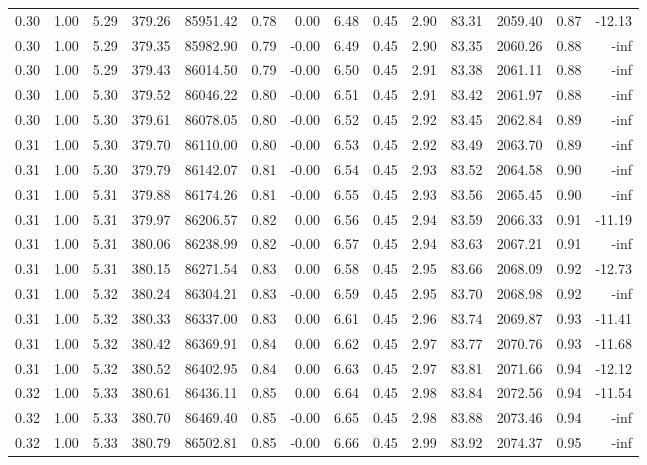 \begin{table}[!ht]
\begin{tabular}{rrrrrrrrrrrrrr}
0.30 & 1.00 & 5.29 & 379.26 & 85951.42 & 0.78 & 0.00 & 6.48 & 0.45 & 2.90 & 83.31 & 2059.40 & 0.87 & -12.13 \\
0.30 & 1.00 & 5.29 & 379.35 & 85982.90 & 0.79 & -0.00 & 6.49 & 0.45 & 2.90 & 83.35 & 2060.26 & 0.88 & -inf \\
0.30 & 1.00 & 5.29 & 379.43 & 86014.50 & 0.79 & -0.00 & 6.50 & 0.45 & 2.91 & 83.38 & 2061.11 & 0.88 & -inf \\
0.30 & 1.00 & 5.30 & 379.52 & 86046.22 & 0.80 & -0.00 & 6.51 & 0.45 & 2.91 & 83.42 & 2061.97 & 0.88 & -inf \\
0.30 & 1.00 & 5.30 & 379.61 & 86078.05 & 0.80 & -0.00 & 6.52 & 0.45 & 2.92 & 83.45 & 2062.84 & 0.89 & -inf \\
0.31 & 1.00 & 5.30 & 379.70 & 86110.00 & 0.80 & -0.00 & 6.53 & 0.45 & 2.92 & 83.49 & 2063.70 & 0.89 & -inf \\
0.31 & 1.00 & 5.30 & 379.79 & 86142.07 & 0.81 & -0.00 & 6.54 & 0.45 & 2.93 & 83.52 & 2064.58 & 0.90 & -inf \\
0.31 & 1.00 & 5.31 & 379.88 & 86174.26 & 0.81 & -0.00 & 6.55 & 0.45 & 2.93 & 83.56 & 2065.45 & 0.90 & -inf \\
0.31 & 1.00 & 5.31 & 379.97 & 86206.57 & 0.82 & 0.00 & 6.56 & 0.45 & 2.94 & 83.59 & 2066.33 & 0.91 & -11.19 \\
0.31 & 1.00 & 5.31 & 380.06 & 86238.99 & 0.82 & -0.00 & 6.57 & 0.45 & 2.94 & 83.63 & 2067.21 & 0.91 & -inf \\
0.31 & 1.00 & 5.31 & 380.15 & 86271.54 & 0.83 & 0.00 & 6.58 & 0.45 & 2.95 & 83.66 & 2068.09 & 0.92 & -12.73 \\
0.31 & 1.00 & 5.32 & 380.24 & 86304.21 & 0.83 & -0.00 & 6.59 & 0.45 & 2.95 & 83.70 & 2068.98 & 0.92 & -inf \\
0.31 & 1.00 & 5.32 & 380.33 & 86337.00 & 0.83 & 0.00 & 6.61 & 0.45 & 2.96 & 83.74 & 2069.87 & 0.93 & -11.41 \\
0.31 & 1.00 & 5.32 & 380.42 & 86369.91 & 0.84 & 0.00 & 6.62 & 0.45 & 2.97 & 83.77 & 2070.76 & 0.93 & -11.68 \\
0.31 & 1.00 & 5.32 & 380.52 & 86402.95 & 0.84 & 0.00 & 6.63 & 0.45 & 2.97 & 83.81 & 2071.66 & 0.94 & -12.12 \\
0.32 & 1.00 & 5.33 & 380.61 & 86436.11 & 0.85 & 0.00 & 6.64 & 0.45 & 2.98 & 83.84 & 2072.56 & 0.94 & -11.54 \\
0.32 & 1.00 & 5.33 & 380.70 & 86469.40 & 0.85 & -0.00 & 6.65 & 0.45 & 2.98 & 83.88 & 2073.46 & 0.94 & -inf \\
0.32 & 1.00 & 5.33 & 380.79 & 86502.81 & 0.85 & -0.00 & 6.66 & 0.45 & 2.99 & 83.92 & 2074.37 & 0.95 & -inf \\

\end{tabular}
\end{table}
